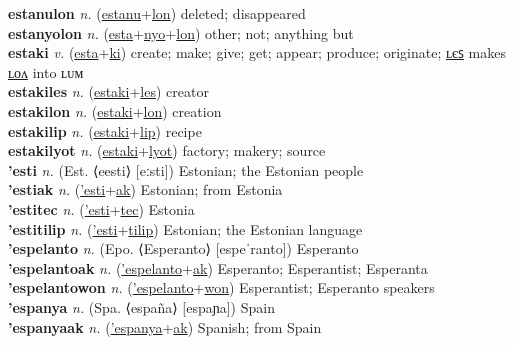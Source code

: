 \textbf{estanulon} \textit{n.} (\hyperref[estanu]{estanu}+\hyperref[lon]{lon})
deleted; disappeared \label{estanulon} \\
\textbf{estanyolon} \textit{n.} (\hyperref[esta]{esta}+\hyperref[nyo]{nyo}+\hyperref[lon]{lon})
other; not; anything but \label{estanyolon} \\
\textbf{estaki} \textit{v.} (\hyperref[esta]{esta}+\hyperref[ki]{ki})
create; make; give; get; appear; produce; originate; \hyperref[estakiles]{ʟєꜱ} makes \hyperref[estakilon]{ʟᴏᴧ} into ʟᴜᴍ \label{estaki} \\
\textbf{estakiles} \textit{n.} (\hyperref[estaki]{estaki}+\hyperref[les]{les})
creator \label{estakiles} \\
\textbf{estakilon} \textit{n.} (\hyperref[estaki]{estaki}+\hyperref[lon]{lon})
creation \label{estakilon} \\
\textbf{estakilip} \textit{n.} (\hyperref[estaki]{estaki}+\hyperref[lip]{lip})
recipe \label{estakilip} \\
\textbf{estakilyot} \textit{n.} (\hyperref[estaki]{estaki}+\hyperref[lyot]{lyot})
factory; makery; source \label{estakilyot} \\
\textbf{'esti} \textit{n.} (Est. ⟨eesti⟩ [eːsti])
Estonian; the Estonian people \label{'esti} \\
\textbf{'estiak} \textit{n.} (\hyperref['esti]{'esti}+\hyperref[ak]{ak})
Estonian; from Estonia \label{'estiak} \\
\textbf{'estitec} \textit{n.} (\hyperref['esti]{'esti}+\hyperref[tec]{tec})
Estonia \label{'estitec} \\
\textbf{'estitilip} \textit{n.} (\hyperref['esti]{'esti}+\hyperref[tilip]{tilip})
Estonian; the Estonian language \label{'estitilip} \\
\textbf{'espelanto} \textit{n.} (Epo. ⟨Esperanto⟩ [espeˈranto])
Esperanto \label{'espelanto} \\
\textbf{'espelantoak} \textit{n.} (\hyperref['espelanto]{'espelanto}+\hyperref[ak]{ak})
Esperanto; Esperantist; Esperanta \label{'espelantoak} \\
\textbf{'espelantowon} \textit{n.} (\hyperref['espelanto]{'espelanto}+\hyperref[won]{won})
Esperantist; Esperanto speakers \label{'espelantowon} \\
\textbf{'espanya} \textit{n.} (Spa. ⟨españa⟩ [espaɲa])
Spain \label{'espanya} \\
\textbf{'espanyaak} \textit{n.} (\hyperref['espanya]{'espanya}+\hyperref[ak]{ak})
Spanish; from Spain \label{'espanyaak} \\
